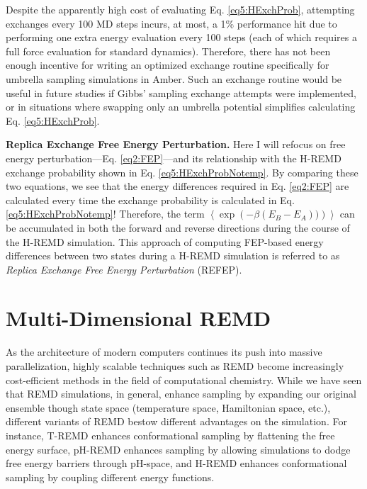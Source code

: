 Despite the apparently high cost of evaluating Eq. \ref{eq5:HExchProb},
attempting exchanges every 100 MD steps incurs, at most, a 1\% performance hit
due to performing one extra energy evaluation every 100 steps (each of which
requires a full force evaluation for standard dynamics). Therefore, there has
not been enough incentive for writing an optimized exchange routine specifically
for umbrella sampling simulations in Amber. Such an exchange routine would be
useful in future studies if Gibbs' sampling exchange attempts were implemented,
\cite{Chodera_JChemPhys_2011_v135_p194110} or in situations where swapping only
an umbrella potential simplifies calculating Eq. \ref{eq5:HExchProb}.

\textbf{Replica Exchange Free Energy Perturbation.} Here I will refocus on free
energy perturbation---Eq. \ref{eq2:FEP}---and its relationship with the H-REMD
exchange probability shown in Eq. \ref{eq5:HExchProbNotemp}. By comparing these
two equations, we see that the energy differences required in Eq. \ref{eq2:FEP}
are calculated every time the exchange probability is calculated in Eq.
\ref{eq5:HExchProbNotemp}!  Therefore, the term
$\left\langle\exp\left(-\beta(E_B-E_A))\right)\right\rangle$ can be accumulated
in both the forward and reverse directions during the course of the H-REMD
simulation. This approach of computing FEP-based energy differences between two
states during a H-REMD simulation is referred to as \emph{Replica Exchange Free
Energy Perturbation} (REFEP). \cite{Meng_JChemTheoryComput_2011_v7_p2721,
Jiang_JChemTheoryComput_2010_v6_p2559}

\section{Multi-Dimensional REMD}

As the architecture of modern computers continues its push into massive
parallelization, highly scalable techniques such as REMD become increasingly
cost-efficient methods in the field of computational chemistry. While we have
seen that REMD simulations, in general, enhance sampling by expanding our
original ensemble though state space (\eg temperature space, Hamiltonian space,
etc.), different variants of REMD bestow different advantages on the simulation.
For instance, T-REMD enhances conformational sampling by flattening the free
energy surface, pH-REMD enhances sampling by allowing simulations to dodge free
energy barriers through pH-space, and H-REMD enhances conformational sampling by
coupling different energy functions.

